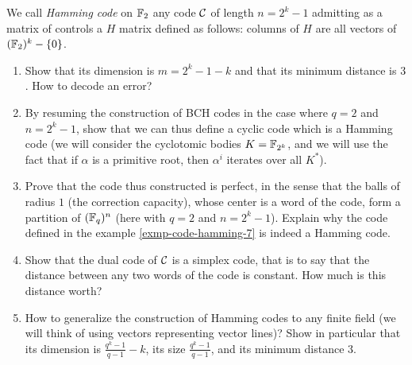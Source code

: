  
\begin{exo}
\label{exo-codes-hamming}
 
  We call \textit{Hamming code} on $ \mathbb{F}_2 $ any code $ \mathcal{C} $ of length $ n = 2^k-1 $ admitting as a matrix of controls a $ H $ matrix defined as follows: columns of $ H $ are all vectors of $ (\mathbb{F}_2)^k - \{0\} $. \begin{enumerate}
\item Show that its dimension is $ m = 2^k-1-k $ and that its minimum distance is $ 3 $. How to decode an error?
\item By resuming the construction of BCH codes in the case where $ q = 2 $ and $ n = 2^k-1 $, show that we can thus define a cyclic code which is a Hamming code (we will consider the cyclotomic bodies $ K = \mathbb{F}_{2^k} $, and we will use the fact that if $ \alpha $ is a primitive  root, then $ \alpha^i $ iterates over all $ K^* $).
\item {} Prove that the code thus constructed is perfect, in the sense that the balls of radius $ 1 $ (the correction capacity), whose center is a word of the code, form a partition of $ ( \mathbb{F}_q)^n $ (here with $ q = 2 $ and $ n = 2^k-1 $). Explain why the code defined in the example \ref{exmp-code-hamming-7} is indeed a Hamming code.
\item {}  Show that the dual code of $ \mathcal{C} $ is a simplex code, that is to say that the distance between any two words of the code is constant. How much is this distance worth?
\item How to generalize the construction of Hamming codes to any finite field (we will think of using vectors representing vector lines)? Show in particular that its dimension is $ \frac{q^k-1}{q-1} -k $, its size $ \frac{q^k-1}{q-1} $, and its minimum distance $ 3 $.
\end{enumerate}
\end{exo}
 
